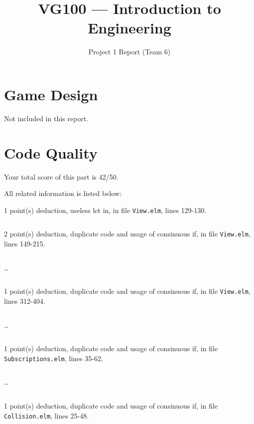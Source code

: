 \documentclass{article}
\title{VG100 --- Introduction to\\ Engineering}
\subtitle{Project 1 Report (Team 6)}
\begin{document}
\maketitle

\section{Game Design}

Not included in this report.

\section{Code Quality}

Your total score of this part is 42/50. \medskip

All related information is listed below: \medskip

1 point(s) {\color{red}deduction}, useless let in, in file {\color{blue}\texttt{View.elm}}, lines {\color{blue}129-130}.

\inputminted[firstline=129,lastline=130]{elm}{View.elm}

2 point(s) {\color{red}deduction}, duplicate code and usage of consinuous if, in file {\color{blue}\texttt{View.elm}}, lines {\color{blue}149-215}.

\inputminted[firstline=149,lastline=158]{elm}{View.elm}

\dots

\inputminted[firstline=206,lastline=215]{elm}{View.elm}

1 point(s) {\color{red}deduction}, duplicate code and usage of consinuous if, in file {\color{blue}\texttt{View.elm}}, lines {\color{blue}312-404}.

\inputminted[firstline=312,lastline=321]{elm}{View.elm}

\dots

\inputminted[firstline=395,lastline=404]{elm}{View.elm}

1 point(s) {\color{red}deduction}, duplicate code and usage of consinuous if, in file {\color{blue}\texttt{Subscriptions.elm}}, lines {\color{blue}35-62}.

\inputminted[firstline=35,lastline=44]{elm}{Subscriptions.elm}

\dots

\inputminted[firstline=53,lastline=62]{elm}{Subscriptions.elm}

1 point(s) {\color{red}deduction}, duplicate code and usage of consinuous if, in file {\color{blue}\texttt{Collision.elm}}, lines {\color{blue}25-48}.
\end{document}
